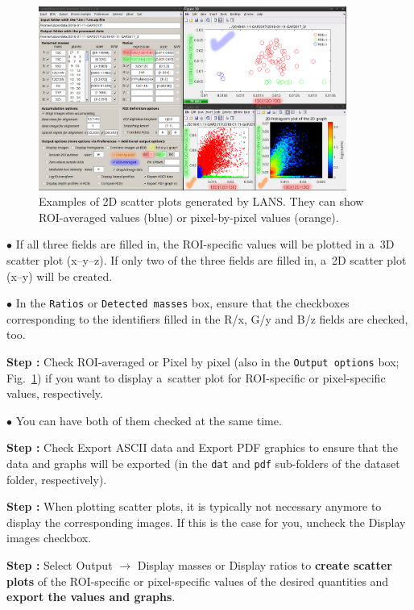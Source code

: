 \documentclass[a4paper, 11pt]{article}
\newcommand{\ttt}[1]{\texttt{#1}}
\newcommand{\lans}[1]{{\color{magenta}#1}}
\newcommand{\lanscb}[1]{{\color{darkgreen}#1}}
\newcommand{\lanstf}[1]{{\color{cyan}#1}}
\newcommand\ra{\rightarrow}
\newcounter{step}
\newcommand\s{\addtocounter{step}{1}\vskip5pt\noindent\textbf{Step \thestep:}{ }}
\newcommand\bul{\vskip5pt\noindent$\bullet${ }}
\newcommand\bb[1]{\textbf{#1}}
\begin{document}
\begin{figure}[!ht]
\centering
\includegraphics[width=0.9\textwidth]{figs3/LANS-scatter-plots}
\caption{\label{fig:scatter-plots}%
Examples of 2D scatter plots generated by LANS. They can show ROI-averaged values (blue) or pixel-by-pixel values (orange).}
\end{figure}
 

\bul If all three fields are filled in, the ROI-specific values will be plotted in a~3D scatter plot (x--y--z). If only two of the three fields are filled in, a~2D scatter plot (x--y) will be created.

\bul In the \ttt{Ratios} or \ttt{Detected masses} box, ensure that the checkboxes corresponding to the identifiers filled in the \lanstf{R/x}, \lanstf{G/y} and \lanstf{B/z} fields are checked, too. 

\s Check \lanscb{ROI-averaged} or \lanscb{Pixel by pixel} (also in the \ttt{Output options} box; Fig.~\ref{fig:scatter-plots}) if you want to display a~scatter plot for ROI-specific or pixel-specific values, respectively.

\bul You can have both of them checked at the same time. 

\s Check \lanscb{Export ASCII data} and \lanscb{Export PDF graphics} to ensure that the data and graphs will be exported (in the \ttt{dat} and \ttt{pdf} sub-folders of the dataset folder, respectively).

\s When plotting scatter plots, it is typically not necessary anymore to display the corresponding images. If this is the case for you, uncheck the \lanscb{Display images} checkbox.

\s Select \lans{Output} $\ra$ \lans{Display masses} or \lans{Display ratios} to \bb{create scatter plots} of the ROI-specific or pixel-specific values of the desired quantities and \bb{export the values and graphs}. 
\end{document}
